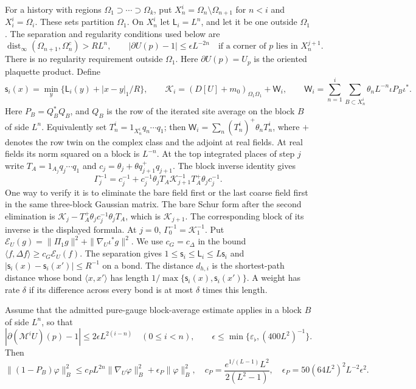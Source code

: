 \documentclass[11pt,letterpaper,reqno]{amsart}
\makeatletter
\theoremstyle{definition}
\newcommand{\ms@minorstart}{%
  \pushQED{\qed}\renewcommand{\qedsymbol}{$\blacksquare$}}
\newenvironment{lemma}[1][]{\ms@minorstart\ms@lemma[#1]}
  {\popQED\endms@lemma}
\theoremstyle{remark}
\makeatother
\begin{document}
For a history with regions $\Omega_1\supset\cdots\supset\Omega_k$,
put $X_n^i=\Omega_n\setminus\Omega_{n+1}$ for $n<i$ and
$X_i^i=\Omega_i$.  These sets partition $\Omega_1$.  On $X_n^i$
let $\mathsf L_i=L^n$, and let it be one outside $\Omega_1$.
The separation and regularity conditions used below are
\[
 \operatorname{dist}_\infty(\Omega_{n+1},\Omega_n^c)>RL^n,
 \qquad
 |\partial U(p)-1|\le\epsilon L^{-2n}
 \quad\text{if a corner of }p\text{ lies in }X_n^{j+1}.
\]
There is no regularity requirement outside $\Omega_1$.
Here $\partial U(p)=U_p$ is the oriented plaquette product.
Define
\[
 \mathsf s_i(x)=\min_y\{\mathsf L_i(y)+|x-y|_1/R\},\qquad
 \mathcal K_i=(D[U]+m_0)_{\Omega_1\Omega_1}+\mathsf W_i,
 \qquad
 \mathsf W_i=\sum_{n=1}^i\sum_{B\subset X_n^i}
                    \theta_nL^{-n}\iota P_B\iota^*.
\]
Here $P_B=Q_B^*Q_B$, and $Q_B$ is the row of the iterated site
average on the block $B$ of side $L^n$.
Equivalently set $T_n^i=1_{X_n^i}q_n\cdots q_1$;
then $\mathsf W_i=\sum_n(T_n^i)^+\theta_nT_n^i$,
where $+$ denotes the row twin on the complex class and
the adjoint at real fields.  At real fields its norm squared on a block
is $L^{-n}$.  At the top integrated places of step $j$
write $T_A=1_{A_j}q_j\cdots q_1$ and
$c_j=\theta_j+\theta q_{j+1}^+q_{j+1}$.  The block
inverse identity gives
\[
 \Gamma_j^{-1}=c_j^{-1}+c_j^{-1}\theta_jT_A
           \mathcal K_{j+1}^{-1}T_A^+\theta_jc_j^{-1}.
\]
One way to verify it is to eliminate the bare field
first or the last coarse field first in the same
three-block Gaussian matrix.  The bare Schur form
after the second elimination is
$\mathcal K_j-T_A^+\theta_jc_j^{-1}\theta_jT_A$,
which is $\mathcal K_{j+1}$.  The corresponding block
of its inverse is the displayed formula.  At $j=0$,
$\Gamma_0^{-1}=\mathcal K_1^{-1}$.
Put $\mathcal E_U(g)=\|\Pi_1g\|^2+\|\nabla_U\iota^*g\|^2$.
We use $c_G=c_\Delta$ in the bound
$\langle f,\Delta f\rangle\ge c_G\mathcal E_U(f)$.
The separation gives
$1\le\mathsf s_i\le\mathsf L_i\le L\mathsf s_i$ and
$|\mathsf s_i(x)-\mathsf s_i(x')|\le R^{-1}$ on a bond.
The distance $d_{h,i}$ is the shortest-path distance
whose bond $\langle x,x'\rangle$ has length
$1/\max\{\mathsf s_i(x),\mathsf s_i(x')\}$.
A weight has rate $\delta$ if its difference across
every bond is at most $\delta$ times this length.

\begin{lemma}[Regular averages]\label{C-397-23}
Assume that the admitted pure-gauge block-average estimate applies in
a block $B$ of side $L^n$, so that
\[
 |\partial(\mathcal M^iU)(p)-1|\le2\epsilon L^{2(i-n)}
 \quad(0\le i<n),\qquad
 \epsilon\le\min\{\varepsilon_\flat,(400L^2)^{-1}\}.
\]
Then
\[
 \|(1-P_B)\varphi\|_B^2\le c_PL^{2n}\|\nabla_U\varphi\|_B^2
                         +\epsilon_P\|\varphi\|_B^2,
 \quad c_P=\frac{e^{1/(L-1)}L^2}{2(L^2-1)},
 \quad\epsilon_P=50(64L^2)^2L^{-2}\epsilon^2.
\]
\end{lemma}
\end{document}
